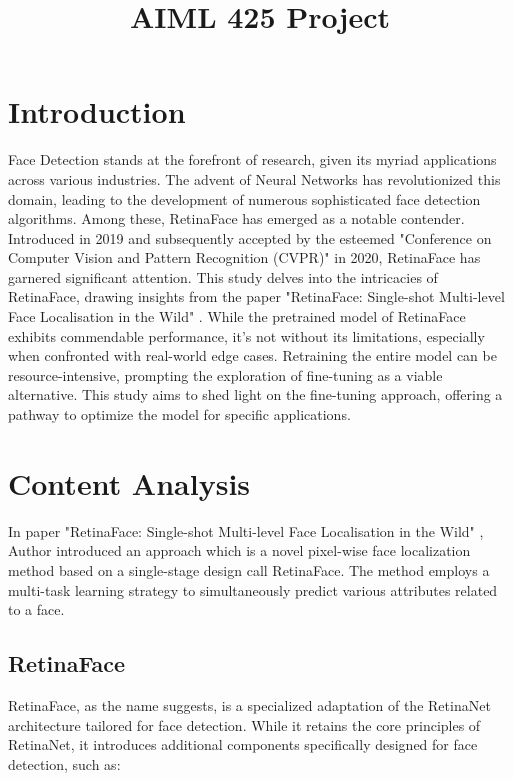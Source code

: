 \documentclass{article}
\title{AIML 425 Project}
\begin{document}
%
\maketitle
%
\section{Introduction}
\label{sec:intro}

Face Detection stands at the forefront of research, given its myriad applications across various industries. 
The advent of Neural Networks has revolutionized this domain, leading to the development of numerous sophisticated face detection algorithms. 
Among these, RetinaFace has emerged as a notable contender. 
Introduced in 2019 and subsequently accepted by the esteemed "Conference on Computer Vision and Pattern Recognition (CVPR)" in 2020, 
RetinaFace has garnered significant attention. 
This study delves into the intricacies of RetinaFace, 
drawing insights from the paper "RetinaFace: Single-shot Multi-level Face Localisation in the Wild" \cite{deng2020retinaface}. 
While the pretrained model of RetinaFace exhibits commendable performance, it's not without its limitations, 
especially when confronted with real-world edge cases. 
Retraining the entire model can be resource-intensive, prompting the exploration of fine-tuning as a viable alternative. 
This study aims to shed light on the fine-tuning approach, offering a pathway to optimize the model for specific applications.

\section{Content Analysis}
\label{sec:content}

In paper "RetinaFace: Single-shot Multi-level Face Localisation in the Wild" \cite{deng2020retinaface}, 
Author introduced an approach which is a  novel pixel-wise face localization method based on a single-stage design call RetinaFace. 
The method employs a multi-task learning strategy to simultaneously predict various attributes related to a face. 

\subsection{RetinaFace}

RetinaFace, as the name suggests, is a specialized adaptation of the RetinaNet architecture tailored for face detection. While it retains the core principles of RetinaNet, it introduces additional components specifically designed for face detection, such as:
\end{document}
